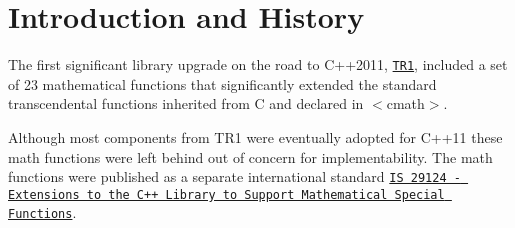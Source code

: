 \hypertarget{index_intro}{}\section{Introduction and History}\label{index_intro}
The first significant library upgrade on the road to C++2011, \href{http://www.open-std.org/JTC1/SC22/WG21/docs/papers/2005/n1836.pdf}{\tt T\+R1}, included a set of 23 mathematical functions that significantly extended the standard transcendental functions inherited from C and declared in $<$cmath$>$.

Although most components from T\+R1 were eventually adopted for C++11 these math functions were left behind out of concern for implementability. The math functions were published as a separate international standard \href{http://www.open-std.org/JTC1/SC22/WG21/docs/papers/2010/n3060.pdf}{\tt I\+S 29124 -\/ Extensions to the C++ Library to Support Mathematical Special Functions}.

